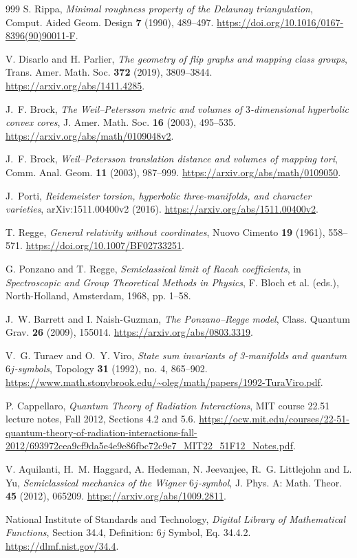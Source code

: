 \documentclass[11pt,a4paper]{article}
\numberwithin{equation}{section}
\theoremstyle{definition}
\theoremstyle{remark}
\begin{document}
\begin{thebibliography}{999}
S. Rippa,
\emph{Minimal roughness property of the Delaunay triangulation},
Comput. Aided Geom. Design \textbf{7} (1990), 489--497.
\url{https://doi.org/10.1016/0167-8396(90)90011-F}.

V. Disarlo and H. Parlier,
\emph{The geometry of flip graphs and mapping class groups},
Trans. Amer. Math. Soc. \textbf{372} (2019), 3809--3844.
\url{https://arxiv.org/abs/1411.4285}.

J.~F. Brock,
\emph{The Weil--Petersson metric and volumes of $3$-dimensional hyperbolic
convex cores},
J. Amer. Math. Soc. \textbf{16} (2003), 495--535.
\url{https://arxiv.org/abs/math/0109048v2}.

J.~F. Brock,
\emph{Weil--Petersson translation distance and volumes of mapping tori},
Comm. Anal. Geom. \textbf{11} (2003), 987--999.
\url{https://arxiv.org/abs/math/0109050}.

J.~Porti,
\emph{Reidemeister torsion, hyperbolic three-manifolds, and character varieties},
arXiv:1511.00400v2 (2016).
\url{https://arxiv.org/abs/1511.00400v2}.

T. Regge,
\emph{General relativity without coordinates},
Nuovo Cimento \textbf{19} (1961), 558--571.
\url{https://doi.org/10.1007/BF02733251}.

G. Ponzano and T. Regge,
\emph{Semiclassical limit of Racah coefficients},
in \emph{Spectroscopic and Group Theoretical Methods in Physics},
F. Bloch et al. (eds.), North-Holland, Amsterdam, 1968, pp. 1--58.

J.~W. Barrett and I. Naish-Guzman,
\emph{The Ponzano--Regge model},
Class. Quantum Grav. \textbf{26} (2009), 155014.
\url{https://arxiv.org/abs/0803.3319}.

V.~G. Turaev and O.~Y. Viro,
\emph{State sum invariants of 3-manifolds and quantum $6j$-symbols},
Topology \textbf{31} (1992), no. 4, 865--902.
\url{https://www.math.stonybrook.edu/~oleg/math/papers/1992-TuraViro.pdf}.

P. Cappellaro,
\emph{Quantum Theory of Radiation Interactions},
MIT course 22.51 lecture notes, Fall 2012, Sections 4.2 and 5.6.
\url{https://ocw.mit.edu/courses/22-51-quantum-theory-of-radiation-interactions-fall-2012/693972cea9cf9da5e4e9e86fbc72c9e7_MIT22_51F12_Notes.pdf}.

V. Aquilanti, H.~M. Haggard, A. Hedeman, N. Jeevanjee,
R.~G. Littlejohn and L. Yu,
\emph{Semiclassical mechanics of the Wigner $6j$-symbol},
J. Phys. A: Math. Theor. \textbf{45} (2012), 065209.
\url{https://arxiv.org/abs/1009.2811}.

National Institute of Standards and Technology,
\emph{Digital Library of Mathematical Functions},
Section 34.4, Definition: $6j$ Symbol, Eq. 34.4.2.
\url{https://dlmf.nist.gov/34.4}.

\end{thebibliography}
\end{document}
